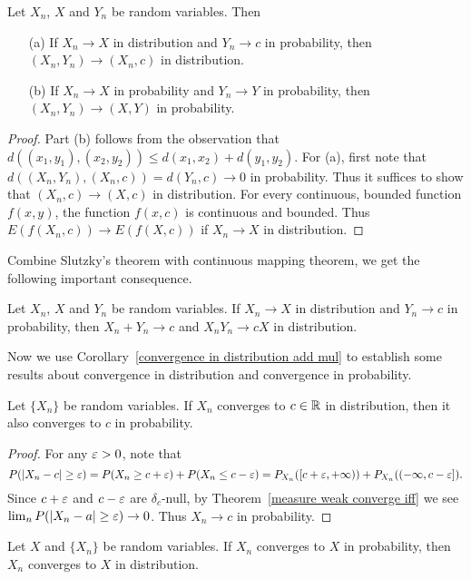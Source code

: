 \begin{theorem}
Let $X_n$, $X$ and $Y_n$ be random variables. Then
\begin{itemize}
\item[(a)] If $X_n\to X$ in distribution and $Y_n\to c$ in probability, then $(X_n,Y_n)\to(X_n,c)$ in distribution.
\item[(b)] If $X_n\to X$ in probability and $Y_n\to Y$ in probability, then $(X_n,Y_n)\to(X,Y)$ in probability.
\end{itemize}
\end{theorem}
\begin{proof}
Part (b) follows from the observation that $d((x_1,y_1),(x_2,y_2))\leq d(x_1,x_2)+d(y_1,y_2)$. For (a), first note that $d((X_n,Y_n),(X_n,c))=d(Y_n,c)\to 0$ in probability. Thus it suffices to show that $(X_n,c)\to (X,c)$ in distribution. For every continuous, bounded function $f(x,y)$, the function $f(x,c)$ is continuous and bounded. Thus $E(f(X_n,c))\to E(f(X,c))$ if $X_n\to X$ in distribution.
\end{proof}
Combine Slutzky's theorem with continuous mapping theorem, we get the following important consequence.
\begin{corollary}\label{convergence in distribution add mul}
Let $X_n$, $X$ and $Y_n$ be random variables. If $X_n\to X$ in distribution and $Y_n\to c$ in probability, then $X_n+Y_n\to c$ and $X_nY_n\to cX$ in distribution.
\end{corollary}
Now we use Corollary~\ref{convergence in distribution add mul} to establish some results about convergence in distribution and convergence in probability.
\begin{proposition}\label{convergence in distribution to constant}
Let $\{X_n\}$ be random variables. If $X_n$ converges to $c\in\mathbb{R}$ in distribution, then it also converges to $c$ in probability.
\end{proposition}
\begin{proof}
For any $\varepsilon>0$, note that
\[P(|X_n-c|\geq\varepsilon)=P(X_n\geq c+\varepsilon)+P(X_n\leq c-\varepsilon)=P_{X_n}([c+\varepsilon,+\infty))+P_{X_n}((-\infty,c-\varepsilon]).\]
Since $c+\varepsilon$ and $c-\varepsilon$ are $\delta_c$-null, by Theorem~\ref{measure weak converge iff} we see $\lim_nP(|X_n-a|\geq\varepsilon)\to 0$. Thus $X_n\to c$ in probability.
\end{proof}
\begin{proposition}\label{convergence in probability imply in distribution}
Let $X$ and $\{X_n\}$ be random variables. If $X_n$ converges to $X$ in probability, then $X_n$ converges to $X$ in distribution.
\end{proposition}
